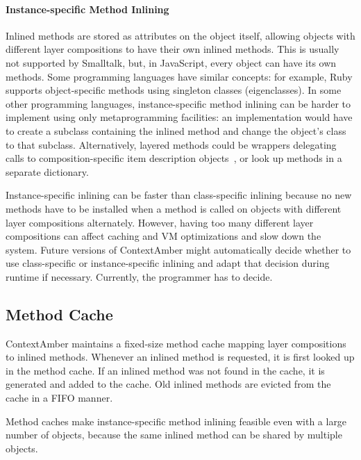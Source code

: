 \documentclass{sig-alternate}
\begin{document}

\paragraph{Instance-specific Method Inlining}
Inlined methods are stored as attributes on the object itself, allowing objects with different layer compositions to have their own inlined methods. This is usually not supported by Smalltalk, but, in JavaScript, every object can have its own methods. Some programming languages have similar concepts: for example, Ruby supports object-specific methods using singleton classes (eigenclasses). In some other programming languages, instance-specific method inlining can be harder to
implement using only metaprogramming facilities: an implementation would have to create a subclass containing the inlined method and change the object's class to that subclass. Alternatively, layered methods could be wrappers delegating calls to composition-specific item description objects~\cite{Coad:1992:OP:130994.131006}, or look up methods in a separate dictionary.

Instance-specific inlining can be faster than class-specific inlining because no new methods have to be installed when a method is called on objects with different layer compositions alternately. However, having too many different layer compositions can affect caching and VM optimizations and slow down the system. Future versions of ContextAmber might automatically decide whether to use class-specific or instance-specific inlining and adapt that decision during runtime if necessary. Currently, the programmer has to decide.

\subsection{Method Cache}
ContextAmber maintains a fixed-size method cache mapping layer compositions to inlined methods. Whenever an inlined method is requested, it is first looked up in the method cache. If an inlined method was not found in the cache, it is generated and added to the cache. Old inlined methods are evicted from the cache in a FIFO manner. 

Method caches make instance-specific method inlining feasible even with a large number of objects, because the same inlined method can be shared by multiple objects.

\end{document}
